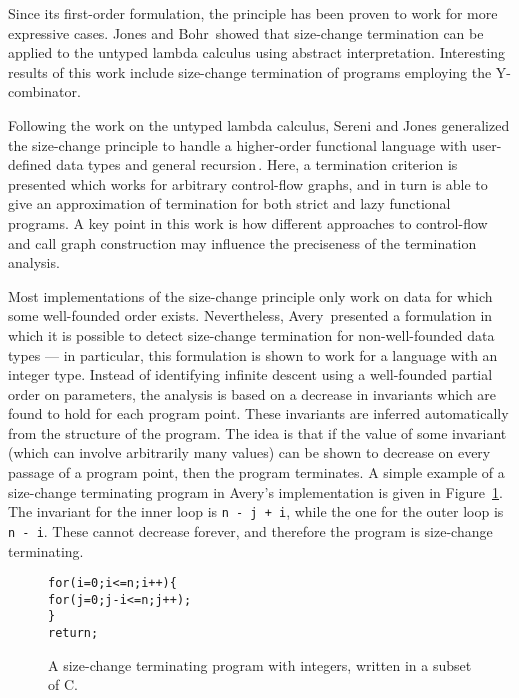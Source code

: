 Since its first-order formulation, the principle has been proven to work for more expressive cases. Jones and Bohr\,\citep{Jones04Untyped} showed that size-change termination can be applied to the untyped lambda calculus using abstract interpretation. Interesting results of this work include size-change termination of programs employing the Y-combinator.

Following the work on the untyped lambda calculus, Sereni and Jones generalized the size-change principle to handle a higher-order functional language with user-defined data types and general recursion\,\citep{Sereni05terminationanalysis,Sereni06Phd}. Here, a termination criterion is presented which works for arbitrary control-flow graphs, and in turn is able to give an approximation of termination for both strict and lazy functional programs. A key point in this work is how different approaches to control-flow and call graph construction may influence the preciseness of the termination analysis.

Most implementations of the size-change principle only work on data for which some well-founded order exists. Nevertheless, Avery\,\citep{Avery06} presented a formulation in which it is possible to detect size-change termination for non-well-founded data types --- in particular, this formulation is shown to work for a language with an integer type. Instead of identifying infinite descent using a well-founded partial order on parameters, the analysis is based on a decrease in invariants which are found to hold for each program point. These invariants are inferred automatically from the structure of the program. The idea is that if the value of some invariant (which can involve arbitrarily many values) can be shown to decrease on every passage of a program point, then the program terminates. A simple example of a size-change terminating program in Avery's implementation is given in Figure~\ref{fig:avery_example}. The invariant for the inner loop is \texttt{n - j + i}, while the one for the outer loop is \texttt{n - i}. These cannot decrease forever, and therefore the program is size-change terminating. 

\begin{figure}
\begin{alltt}
for (i = 0; i <= n; i++) \{
  for (j = 0; j-i <= n; j++);
\}
return;
\end{alltt}
\caption{A size-change terminating program with integers, written in a subset of C.}
\label{fig:avery_example}
\end{figure}

